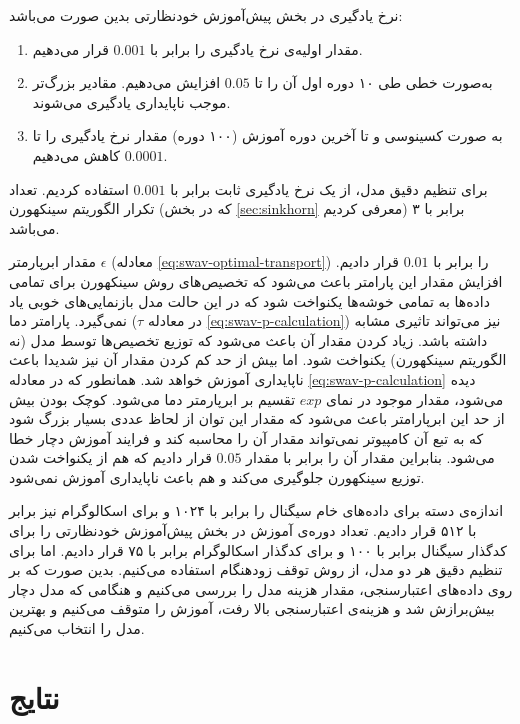 نرخ یادگیری در بخش پیش‌آموزش خودنظارتی بدین صورت می‌باشد:
\begin{enumerate}
    \item مقدار اولیه‌ی نرخ یادگیری را برابر با $0.001$ قرار می‌دهیم.
    \item به‌صورت خطی طی ۱۰ دوره اول آن را تا $0.05$ افزایش می‌دهیم. مقادیر بزرگ‌تر موجب ناپایداری یادگیری می‌شوند.
    \item به صورت کسینوسی و تا آخرین دوره آموزش (۱۰۰ دوره) مقدار نرخ یادگیری را تا $0.0001$ کاهش می‌دهیم.
\end{enumerate}
برای تنظیم دقیق مدل، از یک نرخ یادگیری ثابت برابر با $0.001$ استفاده کردیم.
تعداد تکرار الگوریتم سینکهورن (که در بخش \ref{sec:sinkhorn} معرفی کردیم) برابر با ۳ می‌باشد.

مقدار ابرپارمتر $\epsilon$ (معادله \ref{eq:swav-optimal-transport}) را برابر با $0.01$ قرار دادیم. افزایش مقدار این پارامتر باعث می‌شود که تخصیص‌های روش سینکهورن برای تمامی داده‌ها به تمامی خوشه‌ها یکنواخت شود که در این حالت مدل بازنمایی‌های خوبی یاد نمی‌گیرد. پارامتر دما ($\tau$ در معادله \ref{eq:swav-p-calculation}) نیز می‌تواند تاثیری مشابه داشته باشد. زیاد کردن مقدار آن باعث می‌شود که توزیع تخصیص‌ها توسط مدل (نه الگوریتم سینکهورن) یکنواخت شود. اما بیش از حد کم کردن مقدار آن نیز شدیدا باعث ناپایداری آموزش خواهد شد. همانطور که در معادله \ref{eq:swav-p-calculation} دیده می‌شود،
مقدار موجود در نمای $exp$ تقسیم بر ابرپارمتر دما می‌شود. کوچک بودن بیش از حد این ابرپارامتر باعث می‌شود که مقدار این توان از لحاظ عددی بسیار بزرگ شود که به تبع آن کامپیوتر نمی‌تواند مقدار آن را محاسبه کند و فرایند آموزش دچار  خطا می‌شود. بنابراین مقدار آن را برابر با مقدار $0.05$ قرار دادیم که هم از یکنواخت شدن توزیع سینکهورن جلوگیری می‌کند و هم باعث ناپایداری آموزش نمی‌شود.

اندازه‌ی دسته برای داده‌های خام سیگنال را برابر با ۱۰۲۴ و برای اسکالوگرام نیز برابر با ۵۱۲ قرار دادیم. تعداد دوره‌ی آموزش در بخش پیش‌آموزش خودنظارتی را برای کدگذار سیگنال برابر با ۱۰۰ و برای کدگذار اسکالوگرام برابر با ۷۵ قرار دادیم. اما برای تنظیم دقیق هر دو مدل، از روش توقف زودهنگام
استفاده می‌کنیم. بدین صورت که بر روی داده‌های اعتبارسنجی، مقدار هزینه مدل را بررسی می‌کنیم و هنگامی که مدل دچار بیش‌برازش شد و هزینه‌ی اعتبارسنجی بالا رفت، آموزش را متوقف می‌کنیم و بهترین مدل را انتخاب می‌کنیم.

\section{نتایج}

